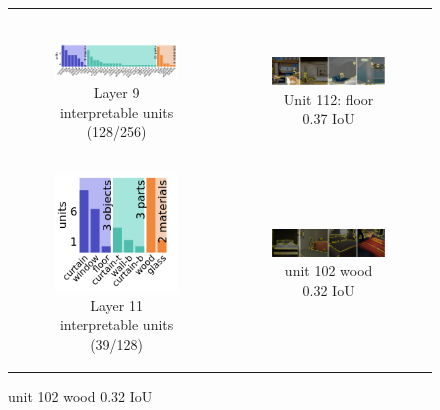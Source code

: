 \documentclass{article}
\begin{document}
\begin{figure}[h!]
\begin{tabular}{c c }
\begin{subfigure}[h!]{0.5\textwidth}
    \end{subfigure} \\
    \begin{subfigure}[h!]{0.6\textwidth}
        \caption{Layer 9 interpretable units (128/256)}
        \includegraphics[scale=0.3]{images/sg_layer9.png}
    \end{subfigure} &
    \begin{subfigure}[h!]{0.5\textwidth}
        \caption{Unit 112: floor 0.37 IoU}
        \includegraphics[scale=0.2]{images/sg_layer9_u112_flooriou_0.37.png}
    \end{subfigure} \\
    \begin{subfigure}[h!]{0.6\textwidth}
        \caption{Layer 11 interpretable units (39/128)}
        \includegraphics[scale=0.4]{images/sg_layer11.png}
    \end{subfigure} & 
    \begin{subfigure}[h!]{0.5\textwidth}
        \caption{unit 102 wood 0.32 IoU}
        \includegraphics[scale=0.2]{images/sg_layer11_unit102_wood_0.32.png}

\end{subfigure}
\end{tabular}
\end{figure}
\end{document}
